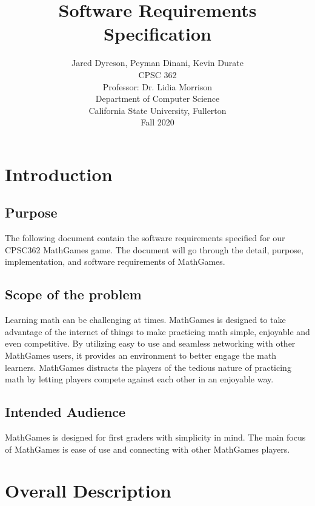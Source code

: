 \documentclass[12pt]{article}
\title{Software Requirements Specification}
\author{Jared Dyreson, Peyman Dinani, Kevin Durate \\
        CPSC 362  \\
        Professor: Dr. Lidia Morrison \\
        Department of Computer Science  \\
        California State University, Fullerton \\
        Fall 2020}
\date
\begin{document}
\begin{titlingpage}
\maketitle
\end{titlingpage}

\newpage

\tableofcontents

\newpage

\section{Introduction}

\subsection{Purpose}

The following document contain the software requirements specified for our CPSC362 MathGames game. 
The document will go through the detail, purpose, implementation, and software requirements of MathGames.

\subsection{Scope of the problem}

Learning math can be challenging at times. 
MathGames is designed to take advantage of the internet of things to make practicing math simple, enjoyable and even competitive. 
By utilizing easy to use and seamless networking with other MathGames users, it provides an environment to better engage the math learners. 
MathGames distracts the players of the tedious nature of practicing math by letting players compete against each other in an enjoyable way.    

\subsection{Intended Audience}

MathGames is designed for first graders with simplicity in mind. 
The main focus of MathGames is ease of use and connecting with other MathGames players.

\newpage

\section{Overall Description}
\end{document}

